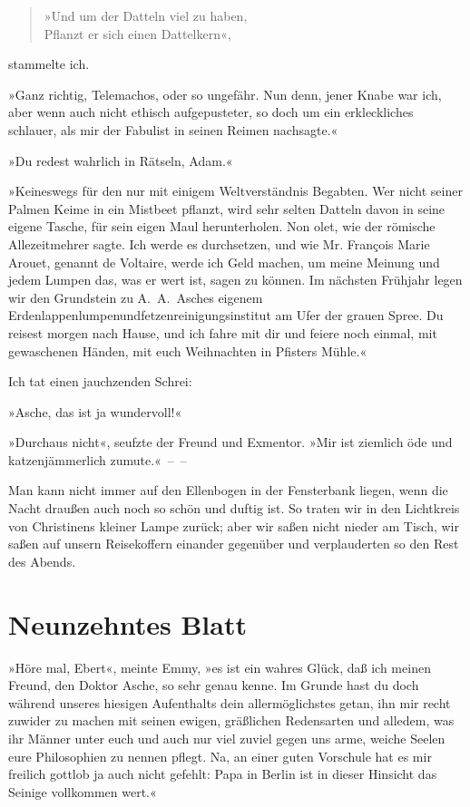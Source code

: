 \begin{verse}
»Und um der Datteln viel zu haben,\\
Pflanzt er sich einen Dattelkern«,
\end{verse}
\noindent
stammelte ich.

»Ganz richtig, Telemachos, oder so ungefähr. Nun denn, jener Knabe
war ich, aber wenn auch nicht ethisch aufgepusteter, so doch um ein
erkleckliches schlauer, als mir der Fabulist in seinen Reimen
nachsagte.«

»Du redest wahrlich in Rätseln, Adam.«

»Keineswegs für den nur mit einigem Weltverständnis Begabten. Wer
nicht seiner Palmen Keime in ein Mistbeet pflanzt, wird sehr selten
Datteln davon in seine eigene Tasche, für sein eigen Maul
herunterholen. Non olet, wie der römische Allezeitmehrer sagte. Ich
werde es durchsetzen, und wie Mr. François Marie Arouet, genannt de
Voltaire, werde ich Geld machen, um meine Meinung und jedem Lumpen
das, was er wert ist, sagen zu können. Im nächsten Frühjahr legen
wir den Grundstein zu A.~A.~Asches eigenem
Erdenlappenlumpenundfetzenreinigungsinstitut am Ufer der grauen
Spree. Du reisest morgen nach Hause, und ich fahre mit dir und
feiere noch einmal, mit gewaschenen Händen, mit euch Weihnachten in
Pfisters Mühle.«

Ich tat einen jauchzenden Schrei:

»Asche, das ist ja wundervoll!«

»Durchaus nicht«, seufzte der Freund und Exmentor. »Mir ist
ziemlich öde und katzenjämmerlich zumute.«~–~–

Man kann nicht immer auf den Ellenbogen in der Fensterbank liegen,
wenn die Nacht draußen auch noch so schön und duftig ist. So traten
wir in den Lichtkreis von Christinens kleiner Lampe zurück; aber
wir saßen nicht nieder am Tisch, wir saßen auf unsern Reisekoffern
einander gegenüber und verplauderten so den Rest des Abends.

\section{Neunzehntes Blatt}

»Höre mal, Ebert«, meinte Emmy, »es ist ein wahres Glück, daß ich
meinen Freund, den Doktor Asche, so sehr genau kenne. Im Grunde
hast du doch während unseres hiesigen Aufenthalts dein
allermöglichstes getan, ihn mir recht zuwider zu machen mit seinen
ewigen, gräßlichen Redensarten und alledem, was ihr Männer unter
euch und auch nur viel zuviel gegen uns arme, weiche Seelen eure
Philosophien zu nennen pflegt. Na, an einer guten Vorschule hat es
mir freilich gottlob ja auch nicht gefehlt: Papa in Berlin ist in
dieser Hinsicht das Seinige vollkommen wert.«


